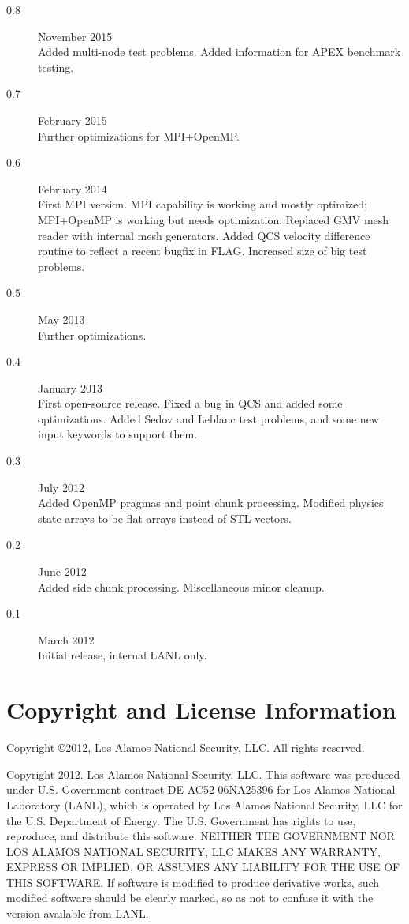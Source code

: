 \documentclass[11pt,letterpaper]{article}
\begin{document}
\begin{description}
\item[0.8] November 2015 \\
     Added multi-node test problems.  Added information for
     APEX benchmark testing.

\item[0.7] February 2015 \\
     Further optimizations for MPI+OpenMP.

\item[0.6] February 2014 \\
     First MPI version.  MPI capability is working and mostly
     optimized; MPI+OpenMP is working but needs optimization.
     Replaced GMV mesh reader with internal mesh generators.
     Added QCS velocity difference routine to reflect a recent
     bugfix in FLAG.  Increased size of big test problems.

\item[0.5] May 2013 \\
     Further optimizations.

\item[0.4] January 2013 \\
     First open-source release.  Fixed a bug in QCS and added some
     optimizations.  Added Sedov and Leblanc test problems, and some
     new input keywords to support them.

\item[0.3] July 2012 \\
     Added OpenMP pragmas and point chunk processing.  Modified physics
     state arrays to be flat arrays instead of STL vectors.

\item[0.2] June 2012 \\
     Added side chunk processing.  Miscellaneous minor cleanup.

\item[0.1] March 2012 \\
     Initial release, internal LANL only.
\end{description}

\section{Copyright and License Information}

Copyright \copyright 2012, Los Alamos National Security, LLC.
All rights reserved.

Copyright 2012. Los Alamos National Security, LLC.
This software was produced under U.S. Government contract
DE-AC52-06NA25396 for Los Alamos National Laboratory (LANL), which is
operated by Los Alamos National Security, LLC for the U.S. Department
of Energy. The U.S. Government has rights to use, reproduce, and
distribute this software. NEITHER THE GOVERNMENT NOR LOS ALAMOS
NATIONAL SECURITY, LLC MAKES ANY WARRANTY, EXPRESS OR IMPLIED, OR
ASSUMES ANY LIABILITY FOR THE USE OF THIS SOFTWARE. If software is
modified to produce derivative works, such modified software should be
clearly marked, so as not to confuse it with the version available from
LANL.
\end{document}
